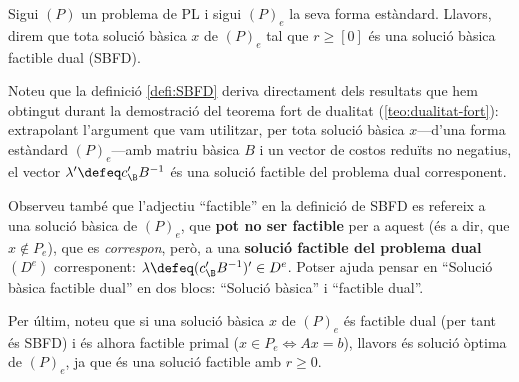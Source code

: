 \begin{defi*}\label{defi:SBFD}
    Sigui $\left(P\right)$ un problema de PL i sigui $(P)_e$ la seva forma estàndard. Llavors, direm que tota solució bàsica $x$ de $\left(P\right)_e$ tal que $r \geq \left[0\right]$ és una solució bàsica factible dual (SBFD).
\end{defi*}

Noteu que la definició \ref{defi:SBFD} deriva directament dels resultats que hem obtingut durant la demostració del teorema fort de dualitat (\ref{teo:dualitat-fort}): extrapolant l'argument que vam utilitzar, per tota solució bàsica $x$---d'una forma estàndard $(P)_e$---amb matriu bàsica $B$ i un vector de costos reduïts no negatius, el vector $\lambda' \defeq c_\B' B^{-1}$ és una solució factible del problema dual corresponent.

Observeu també que l'adjectiu ``factible'' en la definició de SBFD es refereix a una solució bàsica de $(P)_e$, que \textbf{pot no ser factible} per a aquest (és a dir, que $x\notin P_e$), que es \textit{correspon}, però, a una \textbf{solució factible del problema dual} $(D^e)$ corresponent: $\lambda \defeq (c_\B' B^{-1})' \in D^e$. Potser ajuda pensar en ``Solució bàsica factible dual'' en dos blocs: ``Solució bàsica'' i ``factible dual''.

Per últim, noteu que si una solució bàsica $x$ de $(P)_e$ és factible dual (per tant és SBFD) i és alhora factible primal ($x \in P_e \Leftrightarrow Ax = b$), llavors és solució òptima de $(P)_e$, ja que és una solució factible amb $r\ge 0$.


